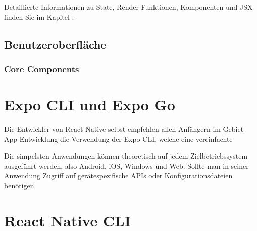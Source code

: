 Detaillierte Informationen zu State, Render-Funktionen, Komponenten und JSX finden Sie im Kapitel
.

\subsection{Benutzeroberfläche}


\subsubsection{Core Components}


\section{Expo CLI und Expo Go}
Die Entwickler von React Native selbst empfehlen allen Anfängern im Gebiet App-Entwicklung die
Verwendung der Expo CLI, welche eine vereinfachte 

Die simpelsten Anwendungen können theoretisch auf jedem Zielbetriebssystem ausgeführt werden, also
Android, iOS, Windows und Web. Sollte man in seiner Anwendung Zugriff auf gerätespezifische APIs
oder Konfigurationsdateien benötigen.

\section{React Native CLI}